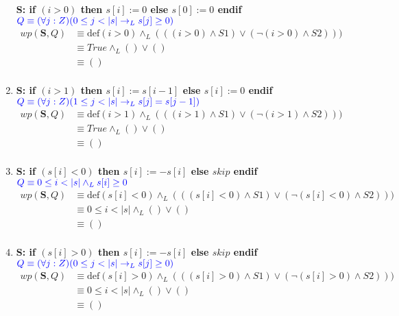 \documentclass{article}
\begin{document}
\begin{enumerate}[label=\alph*)]
		\textbf{S: if $(i>0)$ then $s[i] := 0$ else $s[0] := 0$ endif}\\
   		\hspace*{24mm}$\color{blue}Q \equiv (\forall j :Z)(0 \leq j < |s| 
   			\rightarrow_L s[j] \geq 0)$\\
   		\begin{align*}
   			wp(\textbf{S},Q)&\equiv \textrm{def}(i>0)\wedge_L 
   				(((i>0)\wedge S1) \vee(\neg (i>0)\wedge S2)))\\
   							&\equiv True \wedge_L() \vee ()\\
   							&\equiv () \\
   		\end{align*}
	\item
		\textbf{S: if $(i>1)$ then $s[i] := s[i-1]$ else $s[i] := 0$ endif}\\
   		\hspace*{24mm}$\color{blue}Q \equiv (\forall j :Z)(1 \leq j < |s| 
   			\rightarrow_L s[j] = s[j - 1])$\\
   		\begin{align*}
   			wp(\textbf{S},Q)&\equiv \textrm{def}(i>1)\wedge_L 
   				(((i>1)\wedge S1) \vee(\neg (i>1)\wedge S2)))\\
   							&\equiv True \wedge_L() \vee ()\\
   							&\equiv () \\
   		\end{align*}
	\item
		\textbf{S: if $(s[i]<0)$ then $s[i] := -s[i]$ else $skip$ endif}\\
   		\hspace*{24mm}$\color{blue}Q \equiv 0 \leq i < |s| \wedge_L s[i] \geq 0$\\
   		\begin{align*}
   			wp(\textbf{S},Q)&\equiv \textrm{def}(s[i]<0)\wedge_L 
   				(((s[i]<0)\wedge S1) \vee(\neg (s[i]<0)\wedge S2)))\\
   							&\equiv 0\leq i<|s|\wedge_L() \vee ()\\
   							&\equiv () \\
   		\end{align*}
   	\item
   		\textbf{S: if $(s[i]>0)$ then $s[i]:= -s[i] $ else $skip$ endif}\\
   		\hspace*{24mm}$\color{blue}Q \equiv (\forall j :Z)(0 \leq j < |s| 
   			\rightarrow_L s[j] \geq 0)$\\
   		\begin{align*}
   			wp(\textbf{S},Q)&\equiv \textrm{def}(s[i]>0)\wedge_L 
   				(((s[i]>0)\wedge S1) \vee(\neg (s[i]>0)\wedge S2)))\\
   							&\equiv 0\leq i<|s|\wedge_L() \vee ()\\
   							&\equiv () \\
   		\end{align*}	
\end{enumerate}
                                                          
\end{document}
